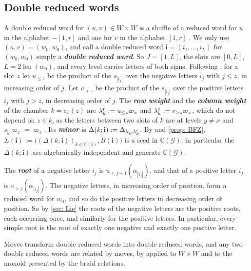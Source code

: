 \documentclass[a4paper]{amsart}
\numberwithin{equation}{section}
\theoremstyle{definition}
\theoremstyle{remark}
\newcommand{\bbC}{\mathbb{C}}
\newcommand{\mcG}{\mathcal{G}}
\newcommand{\bfi}{\mathbf{i}}
\newcommand{\tB}{\widetilde{B}}
\newcommand{\rr}{{\rm r}}
\newcommand{\cc}{{\rm c}}
\newcommand{\len}{\operatorname{len}}
\newcommand{\newword}[1]{\textbf{\emph{#1}}}
\begin{document}
\subsection{Double reduced words}
\label{sec: double words}
A double reduced word for $(u,v)\in W\times W$ is a shuffle of a reduced word for $u$ in the alphabet $-[1,r]$ and one for $v$ in the alphabet $[1,r]$ \cite[Section~2.2]{BFZ05}.
We only use $(u,v)=(w_0,w_0)$, and call a double reduced word $\bfi=(i_1,\dots,i_L)$ for $(w_0,w_0)$ simply a \newword{double reduced word}.
  So $J=[1,L]$, the slots are $[0,L]$, $L=2\len(w_0)$, and every level carries letters of both signs.
Following \cite[(2.9)--(2.11)]{BFZ05}, for a slot $z$ let $u_{\le z}$ be the product of the $s_{|i_j|}$ over the negative letters $i_j$ with $j\le z$, in increasing order of $j$.
Let $v_{>z}$ be the product of the $s_{|i_j|}$ over the positive letters $i_j$ with $j>z$, in decreasing order of $j$.
The \newword{row weight} and the \newword{column weight} of the chamber $k=c_x(z)$ are $\lambda^\rr_k:=u_{\le z}\varpi_x$ and $\lambda^\cc_k:=v_{>z}\varpi_x$, which do not depend on $z\in k$, as the letters between two slots of $k$ are at levels $y\neq x$ and $s_y\varpi_x=\varpi_x$.
  Its \newword{minor} is $\Delta(k;\bfi):=\Delta_{\lambda^\rr_k,\lambda^\cc_k}$.
By \cite[Theorem~2.10]{BFZ05} and \cref{prop: BFZ}, $\Sigma(\bfi):=\big((\Delta(k;\bfi))_{k\in C(\bfi)},\tB(\bfi)\big)$ is a seed in $\bbC(\mcG)$; in particular the $\Delta(k;\bfi)$ are algebraically independent and generate $\bbC(\mcG)$.

The \newword{root} of a negative letter $i_j$ is $u_{\le j-1}(\alpha_{|i_j|})$, and that of a positive letter $i_j$ is $v_{>j}(\alpha_{|i_j|})$.
The negative letters, in increasing order of position, form a reduced word for $w_0$, and so do the positive letters in decreasing order of position.
  So by \cref{sec: Lie} the roots of the negative letters are the positive roots, each occurring once, and similarly for the positive letters.
In particular, every simple root is the root of exactly one negative and exactly one positive letter.

Moves transform double reduced words into double reduced words, and any two double reduced words are related by moves, by \cite[Chapter~IV, Section~1.5, Proposition~5]{Bou02} applied to $W\times W$ and to the monoid presented by the braid relations.
\end{document}
